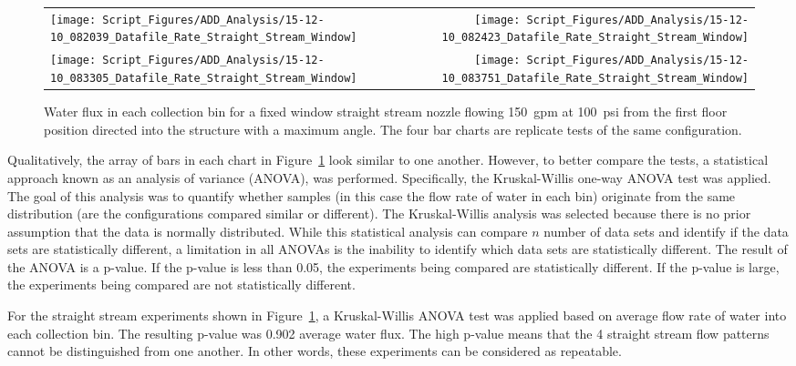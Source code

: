 \documentclass[12pt,oneside]{book}
\begin{document}
\begin{figure}[ht]
\begin{tabular*}{\textwidth}{lr}
\texttt{[image: Script\_Figures/ADD\_Analysis/15-12-10\_082039\_Datafile\_Rate\_Straight\_Stream\_Window]} &
\texttt{[image: Script\_Figures/ADD\_Analysis/15-12-10\_082423\_Datafile\_Rate\_Straight\_Stream\_Window]} \\
\texttt{[image: Script\_Figures/ADD\_Analysis/15-12-10\_083305\_Datafile\_Rate\_Straight\_Stream\_Window]} &
\texttt{[image: Script\_Figures/ADD\_Analysis/15-12-10\_083751\_Datafile\_Rate\_Straight\_Stream\_Window]} \\
\end{tabular*}
\caption[Water Flux for Straight Stream Window at Max Angle]{Water flux in each collection bin for a fixed window straight stream nozzle flowing 150~gpm at 100~psi from the first floor position directed into the structure with a maximum angle. The four bar charts are replicate tests of the same configuration.}
\label{fig:Repeatability_Testing}
\end{figure}

Qualitatively, the array of bars in each chart in Figure~\ref{fig:Repeatability_Testing} look similar to one another. However, to better compare the tests, a statistical approach known as an analysis of variance (ANOVA), was performed. Specifically, the Kruskal-Willis one-way ANOVA test was applied. The goal of this analysis was to quantify whether samples (in this case the flow rate of water in each bin) originate from the same distribution (are the configurations compared similar or different). The Kruskal-Willis analysis was selected because there is no prior assumption that the data is normally distributed. While this statistical analysis can compare $n$ number of data sets and identify if the data sets are statistically different, a limitation in all ANOVAs is the inability to identify which data sets are statistically different. The result of the ANOVA is a p-value. If the p-value is less than 0.05, the experiments being compared are statistically different. If the p-value is large, the experiments being compared are not statistically different.

For the straight stream experiments shown in Figure~\ref{fig:Repeatability_Testing}, a Kruskal-Willis ANOVA test was applied based on average flow rate of water into each collection bin. The resulting p-value was 0.902 average water flux. The high p-value means that the 4 straight stream flow patterns cannot be distinguished from one another. In other words, these experiments can be considered as repeatable.
\end{document}
